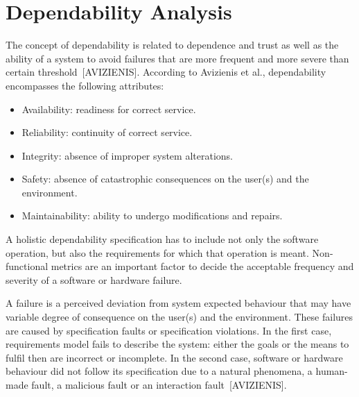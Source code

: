
\section{Dependability Analysis}

The concept of dependability is related to dependence and trust as well as the ability of a system to avoid failures that are more frequent and more severe than certain threshold~[AVIZIENIS]. According to Avizienis et al., dependability encompasses the following attributes: 

\begin{itemize}

\item Availability: readiness for correct service.
\medskip

\item Reliability: continuity of correct service.
\medskip

\item Integrity: absence of improper system alterations.
\medskip

\item Safety: absence of catastrophic consequences on the user(s) and the environment.
\medskip

\item Maintainability: ability to undergo modifications and repairs.
\medskip

\end{itemize}


A holistic dependability specification has to include not only the software operation, but also the requirements for which that operation is meant. Non-functional metrics are an important factor to decide the acceptable frequency and severity of a software or hardware failure. 

A failure is a perceived deviation from system expected behaviour that may have variable degree of consequence on the user(s) and the environment. These failures are caused by specification faults or specification violations. In the first case, requirements model fails to describe the system: either the goals or the means to fulfil then are incorrect or incomplete. In the second case, software or hardware behaviour did not follow its specification due to a natural phenomena, a human-made fault, a malicious fault or an interaction fault~[AVIZIENIS].

